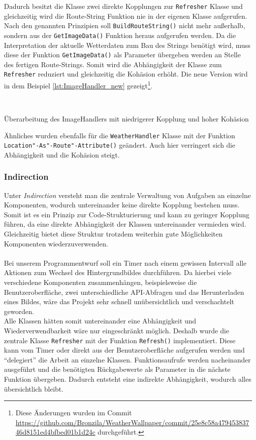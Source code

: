 Dadurch besitzt die Klasse zwei direkte Kopplungen zur \texttt{Refresher} Klasse und gleichzeitig wird die Route-String Funktion nie in der eigenen Klasse aufgerufen.
Nach den genannten Prinzipien soll \texttt{BuildRouteString()} nicht mehr außerhalb, sondern aus der \texttt{GetImageData()} Funktion heraus aufgerufen werden. 
Da die Interpretation der aktuelle Wetterdaten zum Bau des Strings benötigt wird, muss diese der Funktion \texttt{GetImageData()} als Parameter übergeben werden an Stelle des fertigen Route-Strings.
Somit wird die Abhängigkeit der Klasse zum \texttt{Refresher} reduziert und gleichzeitig die Kohäsion erhöht.
Die neue Version wird in dem Beispiel \ref{lst:ImageHandler_new} gezeigt\footnote{Diese Änderungen wurden im Commit \url{https://github.com/Bronzila/WeatherWallpaper/commit/25e8c58a47945383746d8151ed4bfbed01b1d24c} durchgeführt.}.\\
\\
\begin{listing}[tbt]
	\inputminted[linenos=true,frame=lines]{csharp}{Listings/ImageHandler_new.cs}
	\caption{Überarbeitung des ImageHandlers mit niedrigerer Kopplung und hoher Kohäsion}
	\label{lst:ImageHandler_new}
\end{listing}
Ähnliches wurden ebenfalls für die \texttt{WeatherHandler} Klasse mit der Funktion \texttt{Location"-As"-Route"-Attribute()} geändert.
Auch hier verringert sich die Abhängigkeit und die Kohäsion steigt.

\subsubsection{Indirection}
Unter \textit{Indirection} versteht man die zentrale Verwaltung von Aufgaben an einzelne Komponenten, wodurch untereinander keine direkte Kopplung bestehen muss.
Somit ist es ein Prinzip zur Code-Strukturierung und kann zu geringer Kopplung führen, da eine direkte Abhängigkeit der Klassen untereinander vermieden wird.
Gleichzeitig bietet diese Struktur trotzdem weiterhin gute Möglichkeiten Komponenten wiederzuverwenden.\\
\\
Bei unserem Programmentwurf soll ein Timer nach einem gewissen Intervall alle Aktionen zum Wechsel des Hintergrundbildes durchführen.
Da hierbei viele verschiedene Komponenten zusammenhängen, beispielsweise die Benutzeroberfläche, zwei unterschiedliche API-Abfragen und das Herunterladen eines Bildes, wäre das Projekt sehr schnell unübersichtlich und verschachtelt geworden.\\
Alle Klassen hätten somit untereinander eine Abhängigkeit und Wiederverwendbarkeit wäre nur eingeschränkt möglich.
Deshalb wurde die zentrale Klasse \texttt{Refresher} mit der Funktion \texttt{Refresh()} implementiert.
Diese kann vom Timer oder direkt aus der Benutzeroberfläche aufgerufen werden und \enquote{delegiert} die Arbeit an einzelne Klassen.
Funktionsaufrufe werden nacheinander ausgeführt und die benötigten Rückgabewerte als Parameter in die nächste Funktion übergeben.
Dadurch entsteht eine indirekte Abhängigkeit, wodurch alles übersichtlich bleibt.
